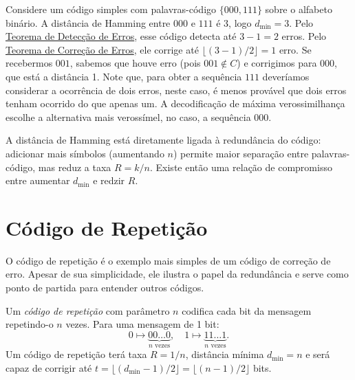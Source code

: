 \begin{example}[Correção de erros em um código de repetição com $n=3$]
Considere um código simples com palavras-código $\{000, 111\}$ sobre o
alfabeto binário. A distância de Hamming entre $000$ e $111$ é 3, logo
$d_{\text{min}} = 3$. Pelo \hyperref[thm:deteccaoerros]{Teorema de Detecção de Erros}, esse código
detecta até $3 - 1 = 2$ erros. Pelo \hyperref[thm:correcaoerros]{Teorema de Correção de Erros}, ele
corrige até $\lfloor (3 - 1)/2 \rfloor = 1$ erro. Se recebermos $001$,
sabemos que houve erro (pois $001 \notin C$) e corrigimos para $000$,
que está a distância 1. Note que, para obter a sequência $111$ deveríamos
considerar a ocorrência de dois erros, neste caso, é menos provável
que dois erros tenham ocorrido do que apenas um. A decodificação
de máxima verossimilhança escolhe a alternativa mais verossímel, no caso,
a sequência $000$.
\end{example}


A distância de Hamming está diretamente ligada à
redundância do código: adicionar mais símbolos (aumentando $n$) permite
maior separação entre palavras-código, mas reduz a taxa $R = k/n$. 
Existe então uma relação de compromisso entre aumentar $d_{\text{min}}$ e
redzir $R$.







\section{Código de Repetição}\label{sec:codrepeticao}

O código de repetição é o exemplo mais simples de um código de correção de
erro. Apesar de sua simplicidade, ele ilustra o papel da redundância e serve
como ponto de partida para entender outros códigos.

\begin{definition}
Um \emph{código de repetição} com parâmetro $n$ codifica cada bit da mensagem repetindo-o $n$ vezes. 
Para uma mensagem de 1 bit:
\begin{equation}
0 \mapsto \underbrace{00\dots0}_{n \text{ vezes}}, \quad 1 \mapsto \underbrace{11\dots1}_{n \text{ vezes}}.
\end{equation}
Um código de repetição terá taxa $R = 1/n$, distância mínima $d_{\text{min}} = n$
e será capaz de corrigir até $t = \lfloor (d_{\text{min}} - 1)/2 \rfloor = \lfloor (n - 1)/2 \rfloor$ bits.
\end{definition}


